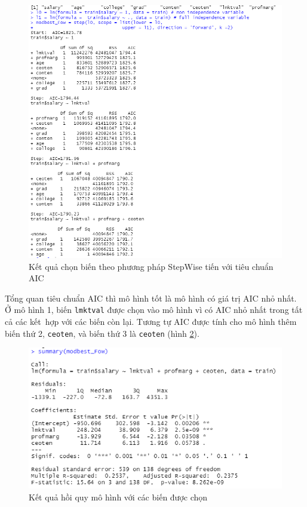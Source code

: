 \begin{figure}[H]
	\centering
	\includegraphics[width=\linewidth]{../Photo Of Result/B1_stepwiseForward.PNG}  
	\caption{Kết quả chọn biến theo phương pháp StepWise tiến với tiêu chuẩn AIC}
	\label{fig-b1:stepwise-forward}
\end{figure}

Tổng quan tiêu chuẩn AIC thì mô hình tốt là mô hình có giá trị AIC nhỏ nhất. Ở mô hình 1, biến \texttt{lmktval} được chọn vào mô hình vì có AIC nhỏ nhất trong tất cả các kết~hợp với các biến còn lại. Tương tự AIC được tính cho mô hình thêm biến thứ 2, \texttt{ceoten}, và biến thứ 3 là \texttt{ceoten} (hình \ref{ex1:model:1}).

\begin{figure}[H]
	\centering
	\includegraphics[width=.7\linewidth]{../Photo Of Result/B1_summary.PNG}  
	\caption{Kết quả hồi quy mô hình với các biến được chọn}
	\label{ex1:model:1}
\end{figure}


